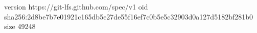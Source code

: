 version https://git-lfs.github.com/spec/v1
oid sha256:2d8be7b7e01921c165db5e27de55f16ef7c0b5e5c32903d0a127d5182bf281b0
size 49248
